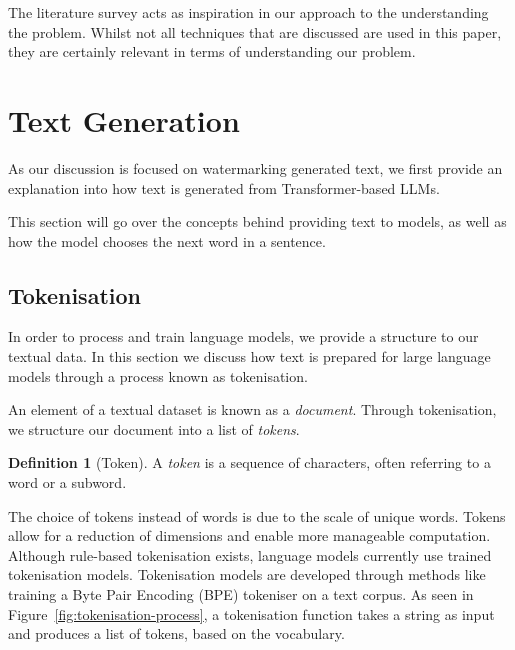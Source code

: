 \documentclass{l4proj}
\theoremstyle{definition}
\newtheorem{definition}{Definition}[section]
\begin{document}
The literature survey acts as inspiration in our approach to the understanding the problem. Whilst not all techniques that are discussed are used in this paper, they are certainly relevant in terms of understanding our problem.

\section{Text Generation}
    As our discussion is focused on watermarking generated text, we first provide an explanation into how text is generated from Transformer-based LLMs.

    This section will go over the concepts behind providing text to models, as well as how the model chooses the next word in a sentence.
    
    \subsection{Tokenisation}
        \label{sec:tokenisation}
        In order to process and train language models, we provide a structure to our textual data. In this section we discuss how text is prepared for large language models through a process known as tokenisation.
        
        An element of a textual dataset is known as a \emph{document}. Through tokenisation, we structure our document into a list of \emph{tokens}.

        \begin{definition}[Token]
            A \emph{token} is a sequence of characters, often referring to a word or a subword.
        \end{definition}

        The choice of tokens instead of words is due to the scale of unique words. Tokens allow for a reduction of dimensions and enable more manageable computation. Although rule-based tokenisation exists, language models currently use trained tokenisation models. Tokenisation models are developed through methods like training a Byte Pair Encoding (BPE) tokeniser \citep{Gage1994ANA, sennrich2016neural} on a text corpus. As seen in Figure~\ref{fig:tokenisation-process}, a tokenisation function takes a string as input and produces a list of tokens, based on the vocabulary. 
        
\end{document}
